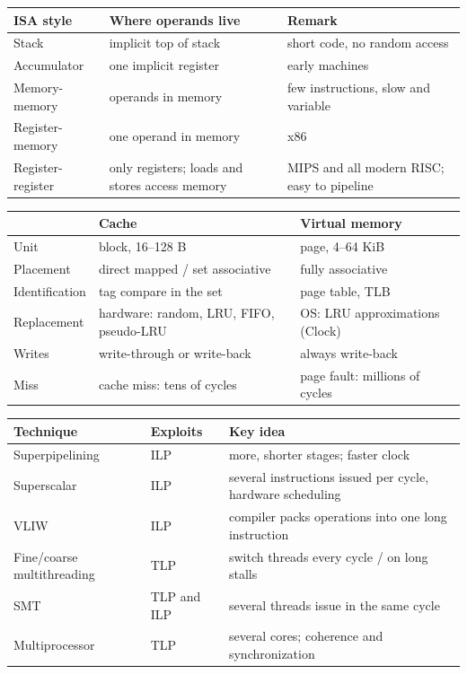 \begin{center}
\begin{tabular}{@{}lp{5cm}p{5.4cm}@{}}
\toprule
ISA style & Where operands live & Remark \\
\midrule
Stack & implicit top of stack & short code, no random access \\
Accumulator & one implicit register & early machines \\
Memory-memory & operands in memory & few instructions, slow and variable \\
Register-memory & one operand in memory & x86 \\
Register-register & only registers; loads and stores access memory &
MIPS and all modern RISC; easy to pipeline \\
\bottomrule
\end{tabular}
\end{center}

\begin{center}
\small
\begin{tabular}{@{}lP{5.3cm}P{5.3cm}@{}}
\toprule
& Cache & Virtual memory \\
\midrule
Unit & block, 16--128 B & page, 4--64 KiB \\
Placement & direct mapped / set associative & fully associative \\
Identification & tag compare in the set & page table, TLB \\
Replacement & hardware: random, LRU, FIFO, pseudo-LRU & OS: LRU approximations (Clock) \\
Writes & write-through or write-back & always write-back \\
Miss & cache miss: tens of cycles & page fault: millions of cycles \\
\bottomrule
\end{tabular}
\end{center}

\begin{center}
\small
\begin{tabular}{@{}lP{4.6cm}P{6.2cm}@{}}
\toprule
Technique & Exploits & Key idea \\
\midrule
Superpipelining & ILP & more, shorter stages; faster clock \\
Superscalar & ILP & several instructions issued per cycle, hardware scheduling \\
VLIW & ILP & compiler packs operations into one long instruction \\
Fine/coarse multithreading & TLP & switch threads every cycle / on long stalls \\
SMT & TLP and ILP & several threads issue in the same cycle \\
Multiprocessor & TLP & several cores; coherence and synchronization \\
\bottomrule
\end{tabular}
\end{center}

